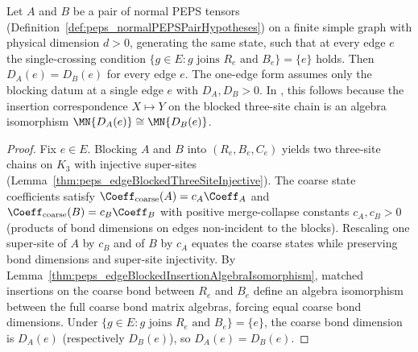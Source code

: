 \begin{lemma}%
    \label{thm:peps_bondDim_eq_of_normalBlocking}
    \leanok
    Let $A$ and $B$ be a pair of normal PEPS tensors
    (Definition~\ref{def:peps_normalPEPSPairHypotheses}) on a finite simple
    graph with physical dimension $d>0$, generating the same state, such that
    at every edge $e$ the single-crossing condition
    $\{g\in E:g\text{ joins }R_e\text{ and }B_e\}=\{e\}$ holds. Then
    $D_A(e)=D_B(e)$ for every edge $e$. The one-edge form assumes only the
    blocking datum at a single edge $e$ with $D_A,D_B>0$.
    In \cite[Section~3]{Molnar2018NormalPEPS}, this follows because the
    insertion correspondence $X\mapsto Y$ on the blocked three-site chain is an
    algebra isomorphism $\MN{D_A(e)}\cong\MN{D_B(e)}$.
    \begin{proof}
        \leanok
        Fix $e\in E$. Blocking $A$ and $B$ into $(R_e,B_e,C_e)$ yields two
        three-site chains on $K_3$ with injective super-sites
        (Lemma~\ref{thm:peps_edgeBlockedThreeSiteInjective}). The coarse state
        coefficients satisfy
        $\Coeff_{\mathrm{coarse}}(A)=c_A\Coeff_A$ and
        $\Coeff_{\mathrm{coarse}}(B)=c_B\Coeff_B$ with positive merge-collapse
        constants $c_A,c_B>0$ (products of bond dimensions on edges non-incident
        to the blocks). Rescaling one super-site of $A$ by $c_B$ and of $B$ by
        $c_A$ equates the coarse states while preserving bond dimensions and
        super-site injectivity. By
        Lemma~\ref{thm:peps_edgeBlockedInsertionAlgebraIsomorphism}, matched
        insertions on the coarse bond between $R_e$ and $B_e$ define an algebra
        isomorphism between the full coarse bond matrix algebras, forcing equal
        coarse bond dimensions. Under $\{g\in E:g\text{ joins }R_e\text{ and }B_e\}=\{e\}$, the coarse bond dimension is $D_A(e)$ (respectively
        $D_B(e)$), so $D_A(e)=D_B(e)$.
    \end{proof}
\end{lemma}


